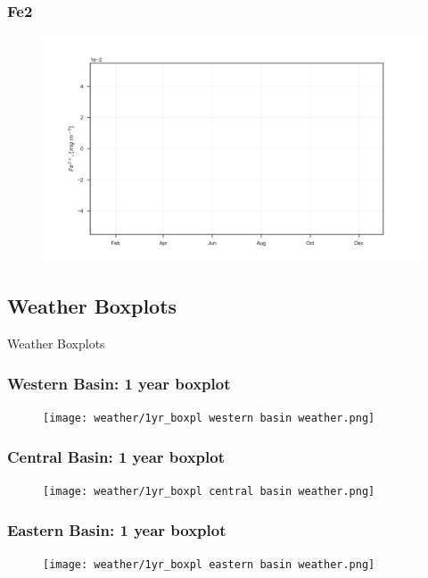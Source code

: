 \documentclass{beamer}
\begin{document}
\begin{frame}
\frametitle{Fe2}
\begin{figure}
\includegraphics[width=\textwidth]{rivers/all/1yr_graph/Fe2.png}
\end{figure}
\end{frame}

\subsection{Weather Boxplots}

\begin{frame}
\begin{center}
\Huge Weather Boxplots
\end{center}
\end{frame}


\begin{frame}
\frametitle{Western Basin: 1 year boxplot}
\begin{figure}
\texttt{[image: weather/1yr\_boxpl  western basin weather.png]}
\end{figure}
\end{frame}

\begin{frame}
\frametitle{Central Basin: 1 year boxplot}
\begin{figure}
\texttt{[image: weather/1yr\_boxpl  central basin weather.png]}
\end{figure}
\end{frame}

\begin{frame}
\frametitle{Eastern Basin: 1 year boxplot}
\begin{figure}
\texttt{[image: weather/1yr\_boxpl  eastern basin weather.png]}
\end{figure}
\end{frame}
\end{document}
